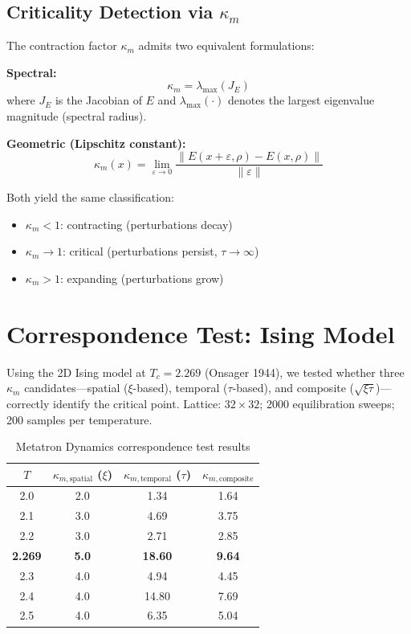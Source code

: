 \documentclass[11pt]{article}
\begin{document}
\subsection*{Criticality Detection via $\kappa_m$}

The contraction factor $\kappa_m$ admits two equivalent formulations:

\medskip
\noindent\textbf{Spectral:}
\begin{equation}
\kappa_m = \lambda_{\max}(J_E)
\end{equation}
where $J_E$ is the Jacobian of $E$ and $\lambda_{\max}(\cdot)$ denotes the largest eigenvalue magnitude (spectral radius).

\medskip
\noindent\textbf{Geometric (Lipschitz constant):}
\begin{equation}
\kappa_m(x) = \lim_{\varepsilon \to 0} \frac{\|E(x+\varepsilon, \rho) - E(x, \rho)\|}{\|\varepsilon\|}
\end{equation}

\medskip
Both yield the same classification:
\begin{itemize}[nosep]
\item $\kappa_m < 1$: contracting (perturbations decay)
\item $\kappa_m \to 1$: critical (perturbations persist, $\tau \to \infty$)
\item $\kappa_m > 1$: expanding (perturbations grow)
\end{itemize}

\section{Correspondence Test: Ising Model}
\label{sec:ising_test}

Using the 2D Ising model at $T_c = 2.269$ (Onsager 1944), we tested whether three $\kappa_m$ candidates---spatial ($\xi$-based), temporal ($\tau$-based), and composite ($\sqrt{\xi\tau}$)---correctly identify the critical point. Lattice: $32 \times 32$; 2000 equilibration sweeps; 200 samples per temperature.

\begin{table}[ht]
\centering
\caption{Metatron Dynamics correspondence test results}
\begin{tabular}{cccc}
\toprule
\textbf{$T$} & $\kappa_{m,\text{spatial}}$ ($\xi$) & $\kappa_{m,\text{temporal}}$ ($\tau$) & $\kappa_{m,\text{composite}}$ \\
\midrule
2.0 & 2.0 & 1.34 & 1.64 \\
2.1 & 3.0 & 4.69 & 3.75 \\
2.2 & 3.0 & 2.71 & 2.85 \\
\textbf{2.269} & \textbf{5.0} & \textbf{18.60} & \textbf{9.64} \\
2.3 & 4.0 & 4.94 & 4.45 \\
2.4 & 4.0 & 14.80 & 7.69 \\
2.5 & 4.0 & 6.35 & 5.04 \\
\bottomrule
\end{tabular}
\end{table}
\end{document}
